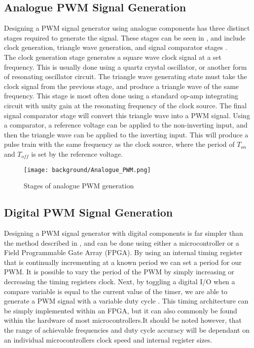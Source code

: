 \subsection{Analogue PWM Signal Generation} \label{S:analogue_PWM_back}

Designing a PWM signal generator using analogue components has three distinct stages required to generate the signal. These stages can be seen in , and include clock generation, triangle wave generation, and signal comparator stages \cite{Caldwell2013}.\\ 

The clock generation stage generates a square wave clock signal at a set frequency. This is usually done using a quartz crystal oscillator, or another form of resonating oscillator circuit. The triangle wave generating state must take the clock signal from the previous stage, and produce a triangle wave of the same frequency. This stage is most often done using a standard op-amp integrating circuit with unity gain at the resonating frequency of the clock source. The final signal comparator stage will convert this triangle wave into a PWM signal. Using a comparator, a reference voltage can be applied to the non-inverting input, and then the triangle wave can be applied to the inverting input. This will produce a pulse train with the same frequency as the clock source, where the period of $T_{on}$ and $T_{off}$ is set by the reference voltage. 

\begin{figure}[H]
	\texttt{[image: background/Analogue\_PWM.png]}
	\caption{Stages of analogue PWM generation}
	\label{F:analogue_PWM}
\end{figure}


\subsection{Digital PWM Signal Generation}\label{S:digital_PWM_back}

Designing a PWM signal generator with digital components is far simpler than the method described in , and can be done using either a microcontroller or a Field Programmable Gate Array (FPGA). By using an internal timing register that is continually incrementing at a known period we can set a period for our PWM. It is possible to vary the period of the PWM by simply increasing or decreasing the timing registers clock. Next, by toggling a digital I/O when a compare variable is equal to the current value of the timer, we are able to generate a PWM signal with a variable duty cycle \cite{Colley2020}. 
This timing architecture can be simply implemented within an FPGA, but it can also commonly be found within the hardware of most microcontrollers.It should be noted however, that the range of achievable frequencies and duty cycle accuracy will be dependant on an individual microcontrollers clock speed and internal register sizes.

